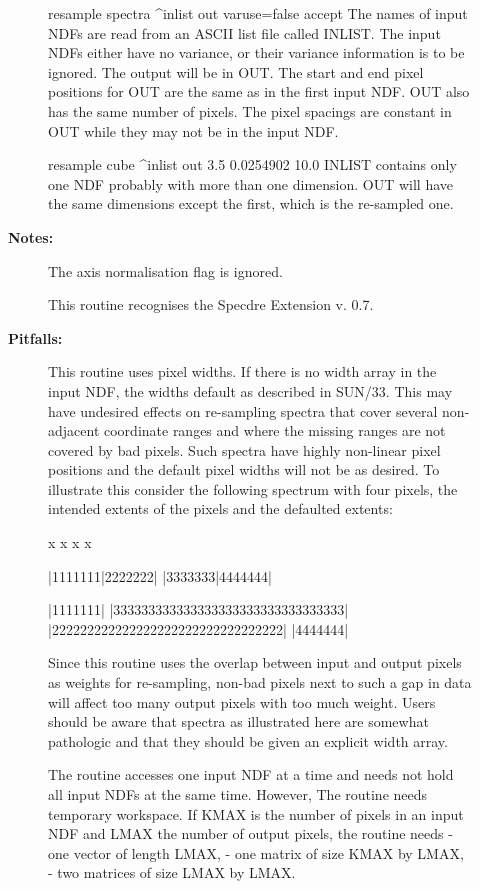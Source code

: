 \begin{description}
\begin{description}
\begin{terminalv}
resample spectra ^inlist out varuse=false accept
   The names of input NDFs are read from an ASCII list file called
   INLIST. The input NDFs either have no variance, or their
   variance information is to be ignored. The output will be in
   OUT. The start and end pixel positions for OUT are the same as
   in the first input NDF. OUT also has the same number of pixels.
   The pixel spacings are constant in OUT while they may not be in
   the input NDF.

resample cube ^inlist out 3.5 0.0254902 10.0
   INLIST contains only one NDF probably with more than one
   dimension. OUT will have the same dimensions except the first,
   which is the re-sampled one.
\end{terminalv}

\item [\textbf{Notes:}]
The axis normalisation flag is ignored.

This routine recognises the Specdre Extension v. 0.7.

\item [\textbf{Pitfalls:}]
   This routine uses pixel widths. If there is no width array in the
   input NDF, the widths default as described in SUN/33. This may
   have undesired effects on re-sampling spectra that cover several
   non-adjacent coordinate ranges and where the missing ranges are
   not covered by bad pixels. Such spectra have highly non-linear
   pixel positions and the default pixel widths will not be as
   desired. To illustrate this consider the following spectrum with
   four pixels, the intended extents of the pixels and the defaulted
   extents:

            x       x                         x       x

        |1111111|2222222|                 |3333333|4444444|

        |1111111|            |333333333333333333333333333333333|
   |222222222222222222222222222222222|            |4444444|

   Since this routine uses the overlap between input and output
   pixels as weights for re-sampling, non-bad pixels next to such a
   gap in data will affect too many output pixels with too much
   weight.
   Users should be aware that spectra as illustrated here are
   somewhat pathologic and that they should be given an explicit
   width array.

   The routine accesses one input NDF at a time and needs not hold
   all input NDFs at the same time. However, The routine needs
   temporary workspace. If KMAX is the number of pixels in an input
   NDF and LMAX the number of output pixels, the routine needs
   -  one vector of length LMAX,
   -  one matrix of size KMAX by LMAX,
   -  two matrices of size LMAX by LMAX.


\end{description}
\end{description}
